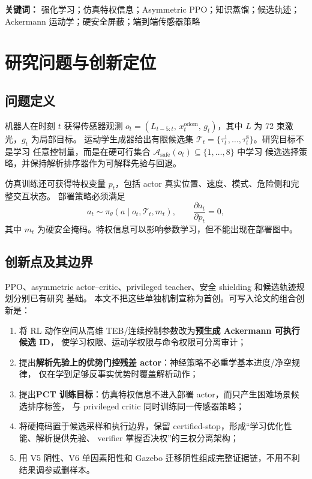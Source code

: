 \documentclass[12pt,a4paper,oneside]{report}
\begin{document}
\noindent\textbf{关键词：} 强化学习；仿真特权信息；Asymmetric PPO；知识蒸馏；候选轨迹；
Ackermann 运动学；硬安全屏蔽；端到端传感器策略

\tableofcontents\listoftables\listoffigures\clearpage{}

\chapter{研究问题与创新定位}
\section{问题定义}
机器人在时刻 $t$ 获得传感器观测
$o_t=(L_{t-5:t},\,x_t^{\mathrm{odom}},\,g_t)$，其中 $L$ 为 72 束激光，$g_t$ 为局部目标。
运动学生成器给出有限候选集 $\mathcal{T}_t=\{\tau_t^1,\ldots,\tau_t^8\}$。研究目标不是学习
任意控制量，而是在硬可行集合 $\mathcal{A}_{\mathrm{safe}}(o_t)\subseteq\{1,\ldots,8\}$ 中学习
候选选择策略，并保持解析排序器作为可解释先验与回退。

仿真训练还可获得特权变量 $p_t$，包括 actor 真实位置、速度、模式、危险侧和完整交互状态。
部署策略必须满足
\begin{equation}
a_t\sim\pi_\theta(a\mid o_t,\mathcal{T}_t,m_t),\qquad
\frac{\partial a_t}{\partial p_t}=0,
\end{equation}
其中 $m_t$ 为硬安全掩码。特权信息可以影响参数学习，但不能出现在部署图中。

\section{创新点及其边界}
PPO、asymmetric actor--critic、privileged teacher、安全 shielding 和候选轨迹规划分别已有研究
基础\cite{schulman2017ppo,pinto2018asymmetric,chen2020cheating,alshiekh2018shielding,rosmann2017teb}。
本文不把这些单独机制宣称为首创。可写入论文的组合创新是：
\begin{enumerate}
  \item 将 RL 动作空间从高维 TEB/连续控制参数改为\textbf{预生成 Ackermann 可执行候选 ID}，
  使学习权限、运动学权限与命令权限可分离审计；
  \item 提出\textbf{解析先验上的优势门控残差 actor}：神经策略不必重学基本进度/净空规律，
  仅在学到足够反事实优势时覆盖解析动作；
  \item 提出\textbf{PCT 训练目标}：仿真特权信息不进入部署 actor，而只产生困难场景候选排序标签，
  与 privileged critic 同时训练同一传感器策略；
  \item 将硬掩码置于候选采样和执行边界，保留 certified-stop，形成“学习优化性能、解析提供先验、
  verifier 掌握否决权”的三权分离架构；
  \item 用 V5 阴性、V6 单因素阳性和 Gazebo 迁移阴性组成完整证据链，不用不利结果调参或删样本。
\end{enumerate}
\end{document}
